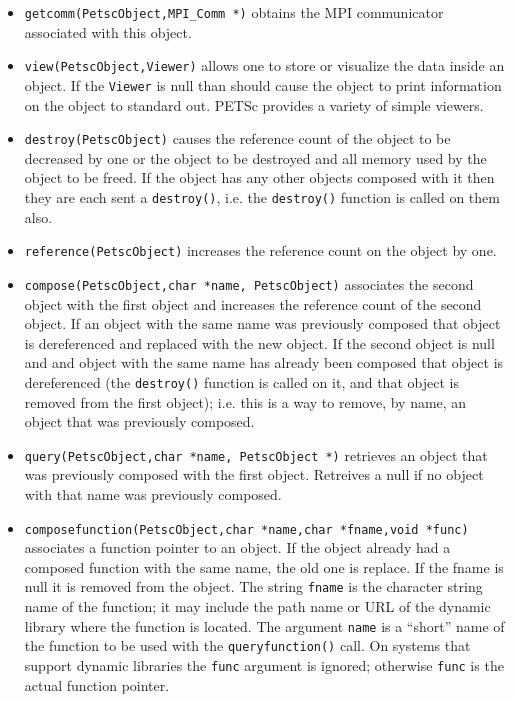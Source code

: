 \begin{itemize}
\item {\tt getcomm(PetscObject,MPI\_Comm *)} obtains the MPI communicator associated
      with this object.

\item {\tt view(PetscObject,Viewer)} allows one to store or visualize the data inside
      an object. If the {\tt Viewer} is null than should cause the object to print 
      information on the object to standard out. PETSc provides a variety of simple
      viewers.

\item {\tt destroy(PetscObject)} causes the reference count of the object to be decreased
      by one or the object to be destroyed and all memory used by the object to be freed.
      If the object has any other objects composed with it then they are each sent a
      {\tt destroy()}, i.e. the {\tt destroy()} function is called on them also.

\item {\tt reference(PetscObject)} increases the reference count on the object by one.

\item {\tt compose(PetscObject,char *name, PetscObject)} associates the second object with 
      the first object and increases the reference count of the second object. If an
      object with the 
      same name was previously composed that object is dereferenced and replaced with 
      the new object. If the 
      second object is null and and object with the same name has already been 
      composed that object is dereferenced (the {\tt destroy()} function is called on 
      it, and that object is removed from the first object); i.e. this is a way to 
      remove, by name, an object that was previously composed. 

\item {\tt query(PetscObject,char *name, PetscObject *)} retrieves an object that was 
      previously composed with the first object. Retreives a null if no object with 
      that name was previously composed.

\item {\tt composefunction(PetscObject,char *name,char *fname,void *func)} associates a function
      pointer to an object. If the object already had a composed function with the 
      same name, the old one is replace. If the fname is null it is removed from 
      the object. The string {\tt fname} is the  character string name of the function;
      it may include the path name or URL of the dynamic library where the function is located.
      The argument {\tt name} is a ``short'' name of the function to be used with the 
      {\tt queryfunction()} call. On systems that support dynamic libraries the {\tt func}
      argument is ignored; otherwise {\tt func} is the actual function pointer.


\end{itemize}
